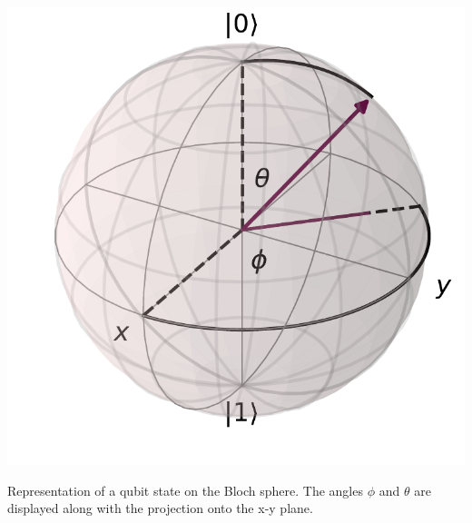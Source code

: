 \begin{marginfigure}[- 7 cm]
    \centering
    \includegraphics[]{Figs/Theory/bloch_sphere.pdf}
    \caption{Representation of a qubit state on the Bloch sphere. The angles $\phi$ and $\theta$ are displayed along with the projection onto the x-y plane.}
    \label{fig:bloch_sphere}
\end{marginfigure}



